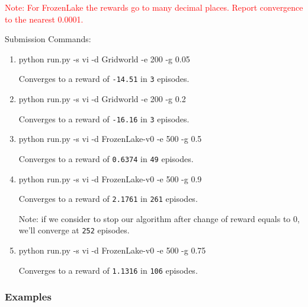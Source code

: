 \documentclass[a4paper]{article}
\theoremstyle{definition}
\newcommand{\red}[1]{\textcolor{red}{#1}}
\newenvironment{soln}{
    \leavevmode\color{blue}\ignorespaces
}{}
\begin{document}
\red{Note: For FrozenLake the rewards go to many decimal places. Report convergence to the nearest 0.0001.}

\vspace{8mm}

Submission Commands:
\begin{enumerate}
	\item   python run.py -s vi -d Gridworld -e 200 -g 0.05

	      \begin{soln}
		      Converges to a reward of \verb|-14.51| in \verb|3| episodes.
	      \end{soln}

	\item   python run.py -s vi -d Gridworld -e 200 -g 0.2

	      \begin{soln}
		      Converges to a reward of \verb|-16.16| in \verb|3| episodes.
	      \end{soln}

	\item  python run.py -s vi -d FrozenLake-v0 -e 500 -g 0.5

	      \begin{soln}
		      Converges to a reward of \verb|0.6374| in \verb|49| episodes.
	      \end{soln}

	\item  python run.py -s vi -d FrozenLake-v0 -e 500 -g 0.9

	      \begin{soln}
		      Converges to a reward of \verb|2.1761| in \verb|261| episodes.

		      Note: if we consider to stop our algorithm after change of reward equals to 0, we'll converge at \verb|252| episodes.
	      \end{soln}

	\item python run.py -s vi -d FrozenLake-v0 -e 500 -g 0.75

	      \begin{soln}
		      Converges to a reward of \verb|1.1316| in \verb|106| episodes.
	      \end{soln}

\end{enumerate}


\subsubsection*{Examples}
\end{document}
